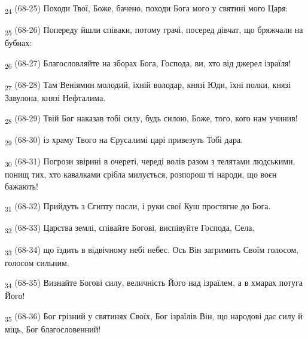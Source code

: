 \begin{tcolorbox}
\textsubscript{24} (68-25) Походи Твої, Боже, бачено, походи Бога мого у святині мого Царя:
\end{tcolorbox}
\begin{tcolorbox}
\textsubscript{25} (68-26) Попереду йшли співаки, потому грачі, посеред дівчат, що бряжчали на бубнах:
\end{tcolorbox}
\begin{tcolorbox}
\textsubscript{26} (68-27) Благословляйте на зборах Бога, Господа, ви, хто від джерел ізраїля!
\end{tcolorbox}
\begin{tcolorbox}
\textsubscript{27} (68-28) Там Веніямин молодий, їхній володар, князі Юди, їхні полки, князі Завулона, князі Нефталима.
\end{tcolorbox}
\begin{tcolorbox}
\textsubscript{28} (68-29) Твій Бог наказав тобі силу, будь силою, Боже, того, кого нам учинив!
\end{tcolorbox}
\begin{tcolorbox}
\textsubscript{29} (68-30) із храму Твого на Єрусалимі царі привезуть Тобі дара.
\end{tcolorbox}
\begin{tcolorbox}
\textsubscript{30} (68-31) Погрози звірині в очереті, череді волів разом з телятами людськими, понищ тих, хто кавалками срібла милується, розпорош ті народи, що воєн бажають!
\end{tcolorbox}
\begin{tcolorbox}
\textsubscript{31} (68-32) Прийдуть з Єгипту посли, і руки свої Куш простягне до Бога.
\end{tcolorbox}
\begin{tcolorbox}
\textsubscript{32} (68-33) Царства землі, співайте Богові, виспівуйте Господа, Села,
\end{tcolorbox}
\begin{tcolorbox}
\textsubscript{33} (68-34) що їздить в відвічному небі небес. Ось Він загримить Своїм голосом, голосом сильним.
\end{tcolorbox}
\begin{tcolorbox}
\textsubscript{34} (68-35) Визнайте Богові силу, величність Його над ізраїлем, а в хмарах потуга Його!
\end{tcolorbox}
\begin{tcolorbox}
\textsubscript{35} (68-36) Бог грізний у святинях Своїх, Бог ізраїлів Він, що народові дає силу й міць, Бог благословенний!
\end{tcolorbox}
